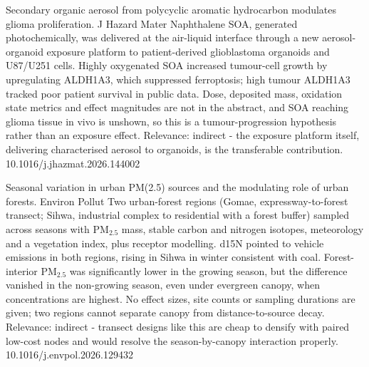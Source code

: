 \documentclass[10pt]{article}
\begin{document}
{Secondary organic aerosol from polycyclic aromatic hydrocarbon modulates glioma proliferation.}
{J Hazard Mater}
{Naphthalene SOA, generated photochemically, was delivered at the air-liquid interface through a new aerosol-organoid exposure platform to patient-derived glioblastoma organoids and U87/U251 cells. Highly oxygenated SOA increased tumour-cell growth by upregulating ALDH1A3, which suppressed ferroptosis; high tumour ALDH1A3 tracked poor patient survival in public data. Dose, deposited mass, oxidation state metrics and effect magnitudes are not in the abstract, and SOA reaching glioma tissue in vivo is unshown, so this is a tumour-progression hypothesis rather than an exposure effect. Relevance: indirect - the exposure platform itself, delivering characterised aerosol to organoids, is the transferable contribution.}
{10.1016/j.jhazmat.2026.144002}

\par{}\baselineskip{}\baselineskip
{}

{Seasonal variation in urban PM(2.5) sources and the modulating role of urban forests.}
{Environ Pollut}
{Two urban-forest regions (Gomae, expressway-to-forest transect; Sihwa, industrial complex to residential with a forest buffer) sampled across seasons with PM$_{2.5}$ mass, stable carbon and nitrogen isotopes, meteorology and a vegetation index, plus receptor modelling. d15N pointed to vehicle emissions in both regions, rising in Sihwa in winter consistent with coal. Forest-interior PM$_{2.5}$ was significantly lower in the growing season, but the difference vanished in the non-growing season, even under evergreen canopy, when concentrations are highest. No effect sizes, site counts or sampling durations are given; two regions cannot separate canopy from distance-to-source decay. Relevance: indirect - transect designs like this are cheap to densify with paired low-cost nodes and would resolve the season-by-canopy interaction properly.}
{10.1016/j.envpol.2026.129432}
\end{document}
